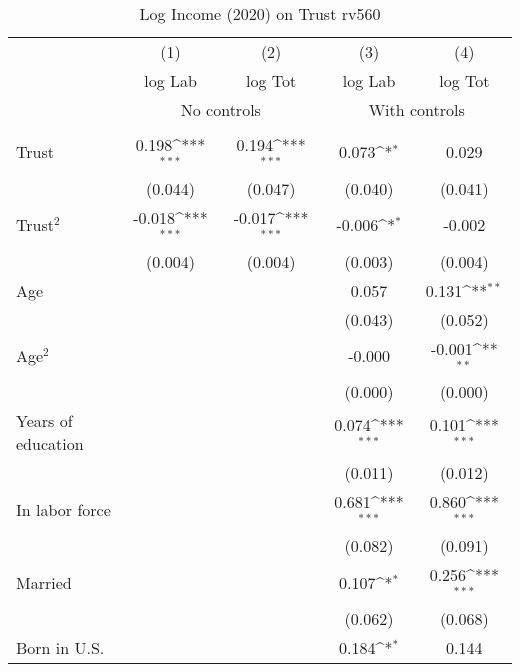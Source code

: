 \begin{table}[htbp]\centering
\def\sym#1{\ifmmode^{#1}\else\(^{#1}\)\fi}
\caption{Log Income (2020) on Trust rv560}
\begin{tabular}{l*{4}{c}}
\toprule
          &\multicolumn{1}{c}{(1)}&\multicolumn{1}{c}{(2)}&\multicolumn{1}{c}{(3)}&\multicolumn{1}{c}{(4)}\\
          &\multicolumn{1}{c}{log Lab}&\multicolumn{1}{c}{log Tot}&\multicolumn{1}{c}{log Lab}&\multicolumn{1}{c}{log Tot}\\
& \multicolumn{2}{c}{No controls} & \multicolumn{2}{c}{With controls} \\\\ \cmidrule(lr){2-3}\cmidrule(lr){4-5}
Trust     &    0.198\sym{***}&    0.194\sym{***}&    0.073\sym{*}  &    0.029         \\
          &  (0.044)         &  (0.047)         &  (0.040)         &  (0.041)         \\
Trust$^{2}$&   -0.018\sym{***}&   -0.017\sym{***}&   -0.006\sym{*}  &   -0.002         \\
          &  (0.004)         &  (0.004)         &  (0.003)         &  (0.004)         \\
Age       &                  &                  &    0.057         &    0.131\sym{**} \\
          &                  &                  &  (0.043)         &  (0.052)         \\
Age$^{2}$ &                  &                  &   -0.000         &   -0.001\sym{**} \\
          &                  &                  &  (0.000)         &  (0.000)         \\
Years of education&                  &                  &    0.074\sym{***}&    0.101\sym{***}\\
          &                  &                  &  (0.011)         &  (0.012)         \\
In labor force&                  &                  &    0.681\sym{***}&    0.860\sym{***}\\
          &                  &                  &  (0.082)         &  (0.091)         \\
Married   &                  &                  &    0.107\sym{*}  &    0.256\sym{***}\\
          &                  &                  &  (0.062)         &  (0.068)         \\
Born in U.S.&                  &                  &    0.184\sym{*}  &    0.144         \\

\end{tabular}
\end{table}
